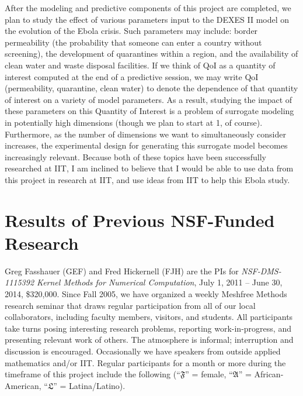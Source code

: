 \documentclass[11pt]{NSFamsart}
\newcommand{\fA}{\mathfrak{A}}
\newcommand{\fF}{\mathfrak{F}}
\newcommand{\fL}{\mathfrak{L}}
\begin{document}
After the modeling and predictive components of this project are completed, we plan to study the effect of various parameters input to the DEXES II model on the evolution of the Ebola crisis.  Such parameters may include: border permeability (the probability that someone can enter a country without screening), the development of quarantines within a region, and the availability of clean water and waste disposal facilities.  If we think of QoI as a quantity of interest computed at the end of a predictive session, we may write QoI (permeability, quarantine, clean water) to denote the dependence of that quantity of interest on a variety of model parameters.  As a result, studying the impact of these parameters on this Quantity of Interest is a problem of surrogate modeling in potentially high dimensions (though we plan to start at 1, of course).  Furthermore, as the number of dimensions we want to simultaneously consider increases, the experimental design for generating this surrogate model becomes increasingly relevant.  Because both of these topics have been successfully researched at IIT, I am inclined to believe that I would be able to use data from this project in research at IIT, and use ideas from IIT to help this Ebola study.

\section{Results of Previous NSF-Funded Research}\label{SectPrevious}

Greg Fasshauer (GEF) and Fred Hickernell (FJH) are the PIs for \emph{NSF-DMS-1115392 Kernel Methods for Numerical Computation}, July 1, 2011 -- June 30, 2014, \$320,000.  Since Fall 2005, we have organized a weekly Meshfree Methods research seminar that draws regular participation from all of our local collaborators, including faculty members, visitors, and students.  All participants take turns posing interesting research problems, reporting work-in-progress, and presenting relevant work of others.  The atmosphere is informal; interruption and discussion is encouraged.  Occasionally we have speakers from outside applied mathematics and/or IIT. Regular participants for a month or more during the timeframe of this project include the following (``$\fF$'' = female,  ``$\fA$'' = African-American, ``$\fL$'' = Latina/Latino).
\end{document}
